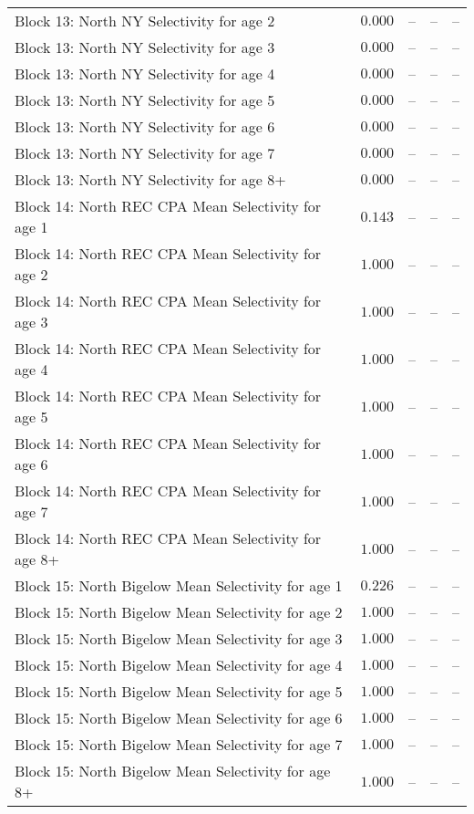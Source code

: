 \documentclass[
]{article}
\begin{document}
\begin{landscape}
\begin{longtable}[t]{lrrrr}
Block 13: North NY Selectivity for age 2 & $0.000$ & -- & -- & --\\
\addlinespace
Block 13: North NY Selectivity for age 3 & $0.000$ & -- & -- & --\\
Block 13: North NY Selectivity for age 4 & $0.000$ & -- & -- & --\\
Block 13: North NY Selectivity for age 5 & $0.000$ & -- & -- & --\\
Block 13: North NY Selectivity for age 6 & $0.000$ & -- & -- & --\\
Block 13: North NY Selectivity for age 7 & $0.000$ & -- & -- & --\\
\addlinespace
Block 13: North NY Selectivity for age 8+ & $0.000$ & -- & -- & --\\
Block 14: North REC CPA Mean Selectivity for age 1 & $0.143$ & -- & -- & --\\
Block 14: North REC CPA Mean Selectivity for age 2 & $1.000$ & -- & -- & --\\
Block 14: North REC CPA Mean Selectivity for age 3 & $1.000$ & -- & -- & --\\
Block 14: North REC CPA Mean Selectivity for age 4 & $1.000$ & -- & -- & --\\
\addlinespace
Block 14: North REC CPA Mean Selectivity for age 5 & $1.000$ & -- & -- & --\\
Block 14: North REC CPA Mean Selectivity for age 6 & $1.000$ & -- & -- & --\\
Block 14: North REC CPA Mean Selectivity for age 7 & $1.000$ & -- & -- & --\\
Block 14: North REC CPA Mean Selectivity for age 8+ & $1.000$ & -- & -- & --\\
Block 15: North Bigelow Mean Selectivity for age 1 & $0.226$ & -- & -- & --\\
\addlinespace
Block 15: North Bigelow Mean Selectivity for age 2 & $1.000$ & -- & -- & --\\
Block 15: North Bigelow Mean Selectivity for age 3 & $1.000$ & -- & -- & --\\
Block 15: North Bigelow Mean Selectivity for age 4 & $1.000$ & -- & -- & --\\
Block 15: North Bigelow Mean Selectivity for age 5 & $1.000$ & -- & -- & --\\
Block 15: North Bigelow Mean Selectivity for age 6 & $1.000$ & -- & -- & --\\
\addlinespace
Block 15: North Bigelow Mean Selectivity for age 7 & $1.000$ & -- & -- & --\\
Block 15: North Bigelow Mean Selectivity for age 8+ & $1.000$ & -- & -- & --\\

\end{longtable}
\end{landscape}
\end{document}
